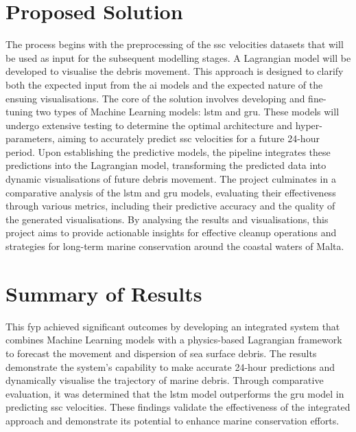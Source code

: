 \section{Proposed Solution}
\label{sec:proposed_solution}
The process begins with the preprocessing of the \acrshort{ssc} velocities datasets that will be used as input for the subsequent modelling stages. A Lagrangian model will be developed to visualise the debris movement. This approach is designed to clarify both the expected input from the \acrshort{ai} models and the expected nature of the ensuing visualisations. The core of the solution involves developing and fine-tuning two types of Machine Learning models: \acrshort{lstm} and \acrshort{gru}. These models will undergo extensive testing to determine the optimal architecture and hyper-parameters, aiming to accurately predict \acrshort{ssc} velocities for a future 24-hour period. Upon establishing the predictive models, the pipeline integrates these predictions into the Lagrangian model, transforming the predicted data into dynamic visualisations of future debris movement. The project culminates in a comparative analysis of the \acrshort{lstm} and \acrshort{gru} models, evaluating their effectiveness through various metrics, including their predictive accuracy and the quality of the generated visualisations. By analysing the results and visualisations, this project aims to provide actionable insights for effective cleanup operations and strategies for long-term marine conservation around the coastal waters of Malta.

\section{Summary of Results}
\label{sec:summary_of_results}
This \acrshort{fyp} achieved significant outcomes by developing an integrated system that combines Machine Learning models with a physics-based Lagrangian framework to forecast the movement and dispersion of sea surface debris. The results demonstrate the system's capability to make accurate 24-hour predictions and dynamically visualise the trajectory of marine debris. Through comparative evaluation, it was determined that the \acrshort{lstm} model outperforms the \acrshort{gru} model in predicting \acrshort{ssc} velocities. These findings validate the effectiveness of the integrated approach and demonstrate its potential to enhance marine conservation efforts.

